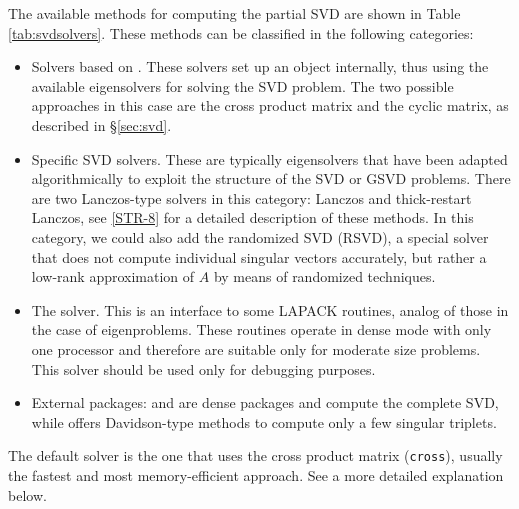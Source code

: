 The available methods for computing the partial SVD are shown in Table \ref{tab:svdsolvers}. These methods can be classified in the following categories:
\begin{itemize}
\item Solvers based on . These solvers set up an  object internally, thus using the available eigensolvers for solving the SVD problem. The two possible approaches in this case are the cross product matrix and the cyclic matrix, as described in \S\ref{sec:svd}.
\item Specific SVD solvers. These are typically eigensolvers that have been adapted algorithmically to exploit the structure of the SVD or GSVD problems. There are two Lanczos-type solvers in this category: Lanczos and thick-restart Lanczos, see \hyperlink{str}{[STR-8]} for a detailed description of these methods. In this category, we could also add the randomized SVD (RSVD), a special solver that does not compute individual singular vectors accurately, but rather a low-rank approximation of $A$ by means of randomized techniques.
\item The \lapack solver. This is an interface to some LAPACK routines, analog of those in the case of eigenproblems. These routines operate in dense mode with only one processor and therefore are suitable only for moderate size problems. This solver should be used only for debugging purposes.
\item External packages: \scalapack and \elemental are dense packages and compute the complete SVD, while \primme offers Davidson-type methods to compute only a few singular triplets.
\end{itemize}
The default solver is the one that uses the cross product matrix (\texttt{cross}), usually the fastest and most memory-efficient approach. See a more detailed explanation below.

